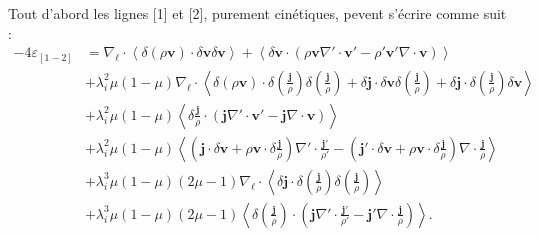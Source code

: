  Tout d'abord les lignes [1] et [2], purement cinétiques, pevent s'écrire comme suit : 
\begin{equation}\begin{array}{rl}\label{eq:turb_bi_EL1-2}%
- 4  \varepsilon_{[1-2]} &= \nabla_{\boldsymbol{\ell}} \cdot\left<  \delta \left(\rho\boldsymbol{v}\right) \cdot \delta \boldsymbol{v} \delta  \boldsymbol{v} \right> +\left< \delta  \boldsymbol{v}\cdot \left(\rho \boldsymbol{v} \nabla' \cdot \boldsymbol{v'} - \rho' \boldsymbol{v'} \nabla \cdot \boldsymbol{v} \right)\right>\\%
&+ \lambda_i^2 \mu\left(1-\mu\right) \nabla_{\boldsymbol{\ell}} \cdot\left< \delta \left(\rho\boldsymbol{v} \right) \cdot \delta \left( \frac{\boldsymbol{j}}{\rho} \right)\delta \left(  \frac{\boldsymbol{j}}{\rho} \right) + \delta \boldsymbol{j} \cdot \delta  \boldsymbol{v}\delta \left(  \frac{\boldsymbol{j}}{\rho} \right) + \delta  \boldsymbol{j}\cdot \delta \left(  \frac{\boldsymbol{j}}{\rho} \right)\delta  \boldsymbol{v}\right> \\%
&+\lambda_i^2 \mu\left(1-\mu\right) \left< \delta  \frac{\boldsymbol{j}}{\rho} \cdot \left( \boldsymbol{j} \nabla' \cdot \boldsymbol{v'}  -  \boldsymbol{j} \nabla \cdot \boldsymbol{v} \right)\right>\\%
&+\lambda_i^2 \mu\left(1-\mu\right) \left< \left( \boldsymbol{j}\cdot\delta  \boldsymbol{v} +\rho \boldsymbol{v}  \cdot\delta  \frac{\boldsymbol{j}}{\rho}  \right)\nabla' \cdot \frac{\boldsymbol{j'}}{\rho'} - \left( \boldsymbol{j'}\cdot\delta  \boldsymbol{v} + \rho \boldsymbol{v} \cdot\delta  \frac{\boldsymbol{j}}{\rho} \right) \nabla \cdot \frac{\boldsymbol{j}}{\rho} \right>\\%
&+ \lambda_i^3\mu\left(1-\mu\right)\left(2\mu - 1\right) \nabla_{\boldsymbol{\ell}} \cdot\left< \delta  \boldsymbol{j} \cdot \delta \left(  \frac{\boldsymbol{j}}{\rho}  \right)\delta \left(  \frac{\boldsymbol{j}}{\rho}  \right) \right>  \\%
&+ \lambda_i^3\mu\left(1-\mu\right)\left(2\mu - 1\right) \left< \delta \left( \frac{\boldsymbol{j}}{\rho}\right) \cdot \left( \boldsymbol{j} \nabla' \cdot \frac{\boldsymbol{j'}}{\rho'} -  \boldsymbol{j'} \nabla \cdot \frac{\boldsymbol{j}}{\rho} \right)\right>.
\end{array}\end{equation} %
